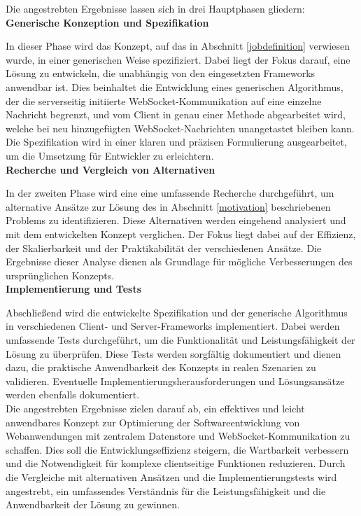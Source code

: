 \documentclass[12pt]{article} %
\begin{document}
Die angestrebten Ergebnisse lassen sich in drei Hauptphasen gliedern:
\\

\textbf{Generische Konzeption und Spezifikation} 

In dieser Phase wird das Konzept, auf das in Abschnitt \ref{jobdefinition} verwiesen wurde, in einer generischen Weise spezifiziert. Dabei liegt der Fokus darauf, eine Lösung zu entwickeln, die unabhängig von den eingesetzten Frameworks anwendbar ist. Dies beinhaltet die Entwicklung eines generischen Algorithmus, der die serverseitig initiierte WebSocket-Kommunikation auf eine einzelne Nachricht begrenzt, und vom Client in genau einer Methode abgearbeitet wird, welche bei neu hinzugefügten WebSocket-Nachrichten unangetastet bleiben kann. Die Spezifikation wird in einer klaren und präzisen Formulierung ausgearbeitet, um die Umsetzung für Entwickler zu erleichtern. \\

\textbf{Recherche und Vergleich von Alternativen}

In der zweiten Phase wird eine eine umfassende Recherche durchgeführt, um alternative Ansätze zur Lösung des in Abschnitt \ref{motivation} beschriebenen Problems zu identifizieren. Diese Alternativen werden eingehend analysiert und mit dem entwickelten Konzept verglichen. Der Fokus liegt dabei auf der Effizienz, der Skalierbarkeit und der Praktikabilität der verschiedenen Ansätze. Die Ergebnisse dieser Analyse dienen als Grundlage für mögliche Verbesserungen des ursprünglichen Konzepts. \\

\textbf{Implementierung und Tests}

Abschließend wird die entwickelte Spezifikation und der generische Algorithmus in verschiedenen Client- und Server-Frameworks implementiert. Dabei werden umfassende Tests durchgeführt, um die Funktionalität und Leistungsfähigkeit der Lösung zu überprüfen. Diese Tests werden sorgfältig dokumentiert und dienen dazu, die praktische Anwendbarkeit des Konzepts in realen Szenarien zu validieren. Eventuelle Implementierungsherausforderungen und Lösungsansätze werden ebenfalls dokumentiert.
\\

Die angestrebten Ergebnisse zielen darauf ab, ein effektives und leicht anwendbares Konzept zur Optimierung der Softwareentwicklung von Webanwendungen mit zentralem Datenstore und WebSocket-Kommunikation zu schaffen. Dies soll die Entwicklungseffizienz steigern, die Wartbarkeit verbessern und die Notwendigkeit für komplexe clientseitige Funktionen reduzieren. Durch die Vergleiche mit alternativen Ansätzen und die Implementierungstests wird angestrebt, ein umfassendes Verständnis für die Leistungsfähigkeit und die Anwendbarkeit der Lösung zu gewinnen.
\end{document}
